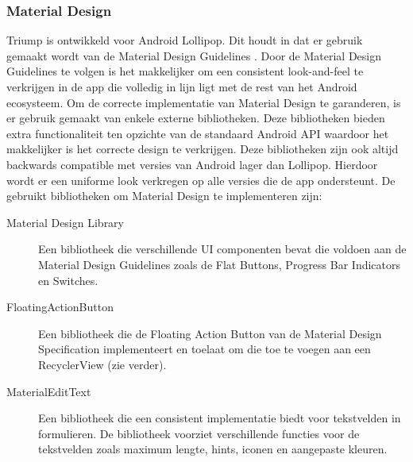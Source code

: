 \subsubsection{Material Design}
Triump is ontwikkeld voor Android Lollipop. Dit houdt in dat er gebruik gemaakt wordt van de Material Design Guidelines \cite{Material_Design}. Door de Material Design Guidelines te volgen is het makkelijker om een consistent look-and-feel te verkrijgen in de app die volledig in lijn ligt met de rest van het Android ecosysteem.
Om de correcte implementatie van Material Design te garanderen, is er gebruik gemaakt van enkele externe bibliotheken. Deze bibliotheken bieden extra functionaliteit ten opzichte van de standaard Android API waardoor het makkelijker is het correcte design te verkrijgen. Deze bibliotheken zijn ook altijd backwards compatible met versies van Android lager dan Lollipop. Hierdoor wordt er een uniforme look verkregen op alle versies die de app ondersteunt.
De gebruikt bibliotheken om Material Design te implementeren zijn:
\begin{description}
	\item[Material Design Library \cite{navasmdc}] Een bibliotheek die verschillende UI componenten bevat die voldoen aan de Material Design Guidelines zoals de Flat Buttons, Progress Bar Indicators en Switches.
	\item[FloatingActionButton \cite{floatingactionbutton}] Een bibliotheek die de Floating Action Button van de Material Design Specification implementeert en toelaat om die toe te voegen aan een RecyclerView (zie verder).
	\item[MaterialEditText \cite{materialedittext}] Een bibliotheek die een consistent implementatie biedt voor tekstvelden in formulieren. De bibliotheek voorziet verschillende functies voor de tekstvelden zoals maximum lengte, hints, iconen en aangepaste kleuren.
\end{description}

